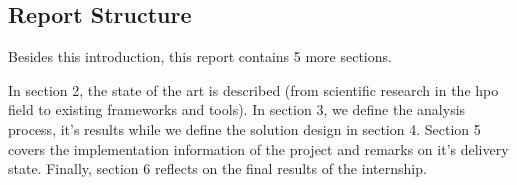 
\subsection{Report Structure}

Besides this introduction, this report contains 5 more sections.

In section 2, the state of the art is described (from scientific research in the \acrfull{hpo} field to existing frameworks and tools). In section 3, we define the analysis process, it's results while we define the solution design in section 4. Section 5 covers the implementation information of the project and remarks on it's delivery state. Finally, section 6 reflects on the final results of the internship.